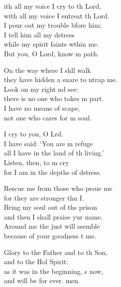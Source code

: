 \begin{psalmverse}
\begin{patverse}
ith all my voice I cry to th Lord,\Med\\
    with all my voice I entreat th Lord.\\
I pour out my trouble bfore him;\Med\\
    I tell him all my d\pointup{\i}stress\\
while my spirit faints w\pointup{\i}thin me.\Med\\
    But you, O Lord, know m path.

On the way where I shll walk\Med\\
    they have hidden a snare to ntrap me.\\
Look on my right nd see:\Med\\
    there is no one who takes m part.\\
I have no means of scape,\Med\\
    not one who cares for m soul.

I cry to you, O Lrd.\Flex\\
    I have said: ‘You are m refuge\Med\\
    all I have in the land of th living.’\\
Listen, then, to m cry\Med\\
    for I am in the depths of d\pointup{\i}stress.

Rescue me from those who prsue me\Med\\
    for they are stronger thn I.\\
Bring my soul out of th\pointup{\i}s prison\Med\\
    and then I shall praise yur name.\\
Around me the just will ssemble\Med\\
    because of your goodness t me.

Glory to the Father and to th Son,\Med\\
    and to the Hol Spirit:\\
as it was in the beginning, \pointup{\i}s now,\Med\\
    and will be for ever. men.
\end{patverse}
\end{psalmverse}
